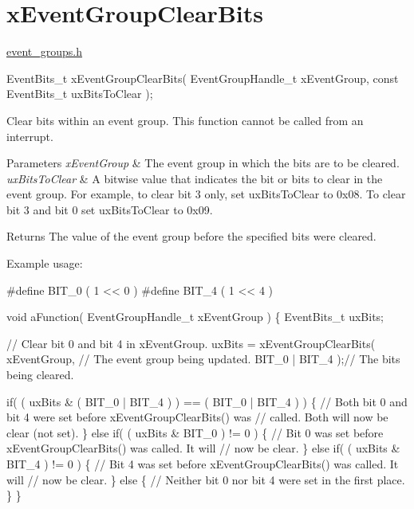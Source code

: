 \hypertarget{group__x_event_group_clear_bits}{}\section{x\+Event\+Group\+Clear\+Bits}
\label{group__x_event_group_clear_bits}
\mbox{\hyperlink{event__groups_8h_source}{event\+\_\+groups.\+h}} 
\begin{DoxyPre}
   EventBits\_t xEventGroupClearBits( EventGroupHandle\_t xEventGroup, const EventBits\_t uxBitsToClear );
\end{DoxyPre}


Clear bits within an event group. This function cannot be called from an interrupt.


\begin{DoxyParams}{Parameters}
{\em x\+Event\+Group} & The event group in which the bits are to be cleared.\\
\hline
{\em ux\+Bits\+To\+Clear} & A bitwise value that indicates the bit or bits to clear in the event group. For example, to clear bit 3 only, set ux\+Bits\+To\+Clear to 0x08. To clear bit 3 and bit 0 set ux\+Bits\+To\+Clear to 0x09.\\
\hline
\end{DoxyParams}
\begin{DoxyReturn}{Returns}
The value of the event group before the specified bits were cleared.
\end{DoxyReturn}
Example usage\+: 
\begin{DoxyPre}
  #define BIT\_0 ( 1 << 0 )
  #define BIT\_4 ( 1 << 4 )\end{DoxyPre}



\begin{DoxyPre}  void aFunction( EventGroupHandle\_t xEventGroup )
  \{
  EventBits\_t uxBits;\end{DoxyPre}



\begin{DoxyPre}    // Clear bit 0 and bit 4 in xEventGroup.
    uxBits = xEventGroupClearBits(
                            xEventGroup,    // The event group being updated.
                            BIT\_0 | BIT\_4 );// The bits being cleared.\end{DoxyPre}



\begin{DoxyPre}    if( ( uxBits \& ( BIT\_0 | BIT\_4 ) ) == ( BIT\_0 | BIT\_4 ) )
    \{
        // Both bit 0 and bit 4 were set before xEventGroupClearBits() was
        // called.  Both will now be clear (not set).
    \}
    else if( ( uxBits \& BIT\_0 ) != 0 )
    \{
        // Bit 0 was set before xEventGroupClearBits() was called.  It will
        // now be clear.
    \}
    else if( ( uxBits \& BIT\_4 ) != 0 )
    \{
        // Bit 4 was set before xEventGroupClearBits() was called.  It will
        // now be clear.
    \}
    else
    \{
        // Neither bit 0 nor bit 4 were set in the first place.
    \}
  \}
  \end{DoxyPre}
 